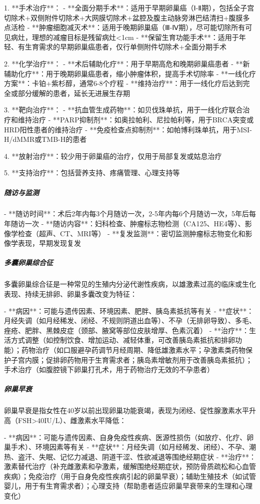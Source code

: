 \begin{enumerate}
1. **手术治疗**：
   - **全面分期手术**：适用于早期卵巢癌（Ⅰ-Ⅱ期），包括全子宫切除术+双侧附件切除术+大网膜切除术+盆腔及腹主动脉旁淋巴结清扫+腹膜多点活检
   - **肿瘤细胞减灭术**：适用于晚期卵巢癌（Ⅲ-Ⅳ期），尽可能切除所有可见病灶，理想的减瘤目标是残留病灶<1cm
   - **保留生育功能手术**：适用于年轻、有生育需求的早期卵巢癌患者，仅行单侧附件切除术+全面分期手术

2. **化学治疗**：
   - **术后辅助化疗**：用于早期高危和晚期卵巢癌患者
   - **新辅助化疗**：用于晚期卵巢癌患者，缩小肿瘤体积，提高手术切除率
   - **一线化疗方案**：卡铂+紫杉醇，通常6-8个疗程
   - **维持治疗**：用于一线化疗后达到完全或部分缓解的患者，延长无进展生存期

3. **靶向治疗**：
   - **抗血管生成药物**：如贝伐珠单抗，用于一线化疗联合治疗和维持治疗
   - **PARP抑制剂**：如奥拉帕利、尼拉帕利等，用于BRCA突变或HRD阳性患者的维持治疗
   - **免疫检查点抑制剂**：如帕博利珠单抗，用于MSI-H/dMMR或TMB-H的患者

4. **放射治疗**：较少用于卵巢癌的治疗，仅用于局部复发或姑息治疗

5. **支持治疗**：包括营养支持、疼痛管理、心理支持等

\subparagraph{随访与监测}

- **随访时间**：术后2年内每3个月随访一次，2-5年内每6个月随访一次，5年后每年随访一次
- **随访内容**：妇科检查、肿瘤标志物检测（CA125、HE4等）、影像学检查（超声、CT、MRI等）
- **复发监测**：密切监测肿瘤标志物变化和影像学表现，早期发现复发

\subparagraph{多囊卵巢综合征}

多囊卵巢综合征是一种常见的生殖内分泌代谢性疾病，以雄激素过高的临床或生化表现、持续无排卵、卵巢多囊改变为特征：

- **病因**：可能与遗传因素、环境因素、肥胖、胰岛素抵抗等有关
- **症状**：月经失调（如月经稀发、闭经、不规则阴道出血等）、不孕（无排卵导致）、多毛、痤疮、肥胖、黑棘皮症（颈部、腋窝等部位皮肤增厚、色素沉着）
- **治疗**：生活方式调整（如控制饮食、增加运动、减轻体重，可改善胰岛素抵抗和排卵功能）；药物治疗（如口服避孕药调节月经周期、降低雄激素水平；孕激素类药物保护子宫内膜；促排卵药物用于生育需求者；胰岛素增敏剂用于改善胰岛素抵抗）；手术治疗（如腹腔镜下卵巢打孔术，用于药物治疗无效的不孕患者）

\subparagraph{卵巢早衰}

卵巢早衰是指女性在40岁以前出现卵巢功能衰竭，表现为闭经、促性腺激素水平升高（FSH>40IU/L）、雌激素水平降低：

- **病因**：可能与遗传因素、自身免疫性疾病、医源性损伤（如放疗、化疗、卵巢手术）、环境因素等有关
- **症状**：月经失调（如月经稀发、闭经）、不孕、潮热、盗汗、失眠、记忆力减退、阴道干涩、性欲减退等围绝经期症状
- **治疗**：激素替代治疗（补充雌激素和孕激素，缓解围绝经期症状，预防骨质疏松和心血管疾病）；免疫治疗（用于自身免疫性疾病引起的卵巢早衰）；辅助生殖技术（如试管婴儿，用于有生育需求者）；心理支持（帮助患者适应卵巢早衰带来的生理和心理变化）


\end{enumerate}
